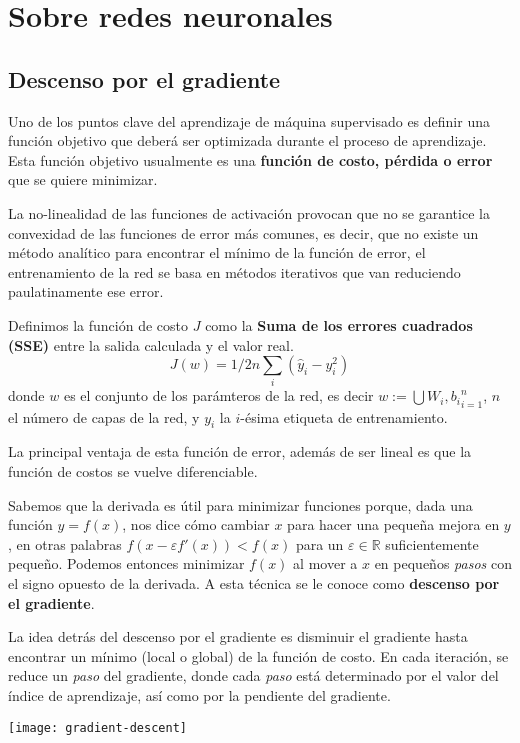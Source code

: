 \section{Sobre redes neuronales}
  \blindtext
\subsection{Descenso por el gradiente}
Uno de los puntos clave del aprendizaje de máquina supervisado es
definir una función objetivo que deberá ser optimizada durante el
proceso de aprendizaje. Esta función objetivo usualmente es una
\textbf{función de costo, pérdida o error} que se quiere minimizar.

La no-linealidad de las funciones de activación provocan que no se garantice la convexidad
de las funciones de error más comunes, es decir, que no existe un método analítico para
encontrar el mínimo de la función de error, el entrenamiento de la red se basa en
métodos iterativos que van reduciendo paulatinamente ese error.

Definimos la función de costo $J$ como la \textbf{Suma de
  los errores cuadrados (SSE)} entre la salida calculada y el valor
real.
\begin{equation}
  J(w)=1/2n \sum_i (\hat{y}_i - y_i^2)
\end{equation}
donde $w$ es el conjunto de los parámteros de la red, es decir
$w := \bigcup{W_i, b_i}_{i=1}^{n}$, $n$ el número de capas de la red, y $y_i$
la $i$-ésima etiqueta de entrenamiento.

La principal ventaja de esta función de error, además de ser lineal
es que la función de costos se vuelve diferenciable.

Sabemos que la derivada es útil para minimizar funciones porque, dada una función
$y = f(x)$, nos dice cómo cambiar $x$ para hacer una pequeña mejora en $y$, en
otras palabras $f(x-\varepsilon f'(x)) < f(x)$ para un $\varepsilon \in \mathbb{R}$
suficientemente pequeño. Podemos entonces minimizar $f(x)$ al mover a $x$ en pequeños
\textit{pasos} con el signo opuesto de la derivada. A esta técnica se le conoce como
\textbf{descenso por el gradiente}.

La idea detrás del descenso por el gradiente es disminuir el gradiente hasta encontrar
un mínimo (local o global) de la función de costo. En cada iteración, se reduce
un \textit{paso} del gradiente, donde cada \textit{paso} está determinado por
el valor del índice de aprendizaje, así como por la pendiente del gradiente.

\texttt{[image: gradient-descent]}


